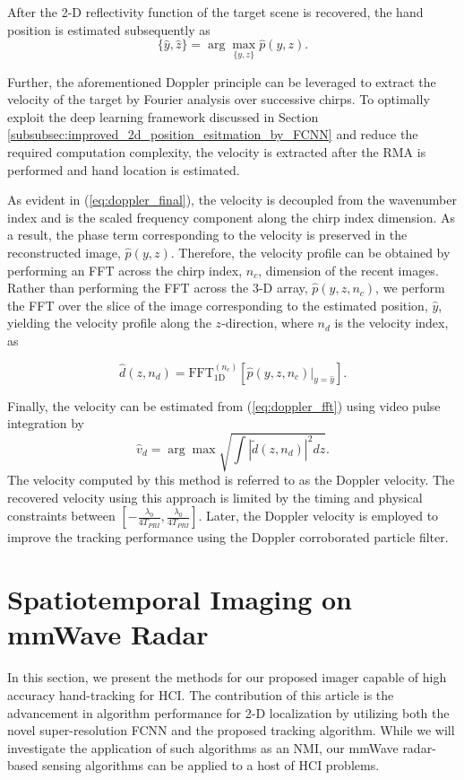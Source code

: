 \documentclass[10pt,journal,final]{IEEEtran}
\begin{document}
After the 2-D reflectivity function of the target scene is recovered, the hand position is estimated subsequently as
\begin{equation}
\label{eq:location_estimate}
    \{\hat{y},\hat{z}\} = \arg \max_{\{y,z\}} \hat{p}(y,z).
\end{equation}

Further, the aforementioned Doppler principle can be leveraged to extract the velocity of the target by Fourier analysis over successive chirps. 
To optimally exploit the deep learning framework discussed in Section \ref{subsubsec:improved_2d_position_esitmation_by_FCNN} and reduce the required computation complexity, the velocity is extracted after the RMA is performed and hand location is estimated.

As evident in (\ref{eq:doppler_final}), the velocity is decoupled from the wavenumber index and is the scaled frequency component along the chirp index dimension. 
As a result, the phase term corresponding to the velocity is preserved in the reconstructed image, $\hat{p}(y,z)$. 
Therefore, the velocity profile can be obtained by performing an FFT across the chirp index, $n_c$, dimension of the recent images.
Rather than performing the FFT across the 3-D array, $\hat{p}(y,z,n_c)$, we perform the FFT over the slice of the image corresponding to the estimated position, $\hat{y}$, yielding the velocity profile along the $z$-direction, where $n_d$ is the velocity index, as

\begin{equation}
	\label{eq:doppler_fft}
	\hat{d}(z,n_d) = \text{FFT}_{\text{1D}}^{(n_c)} \left[ \hat{p}(y,z,n_c) \biggr\rvert_{y = \hat{y}} \right].
\end{equation}

Finally, the velocity can be estimated from (\ref{eq:doppler_fft}) using video pulse integration by 
\begin{equation}
	\label{eq:velocity_doppler}
	\hat{v}_d = \arg \max \sqrt{\int |\tilde{d}(z,n_d)|^2 dz}.
\end{equation}
The velocity computed by this method is referred to as the Doppler velocity.
The recovered velocity using this approach is limited by the timing and physical constraints between $[-\frac{\lambda_0}{4T_{PRI}},\frac{\lambda_0}{4T_{PRI}}]$.
Later, the Doppler velocity is employed to improve the tracking performance using the Doppler corroborated particle filter.

\section{Spatiotemporal Imaging on mmWave Radar}
\label{sec:the_radar_musical_instrument}
In this section, we present the methods for our proposed imager capable of high accuracy hand-tracking for HCI. 
The contribution of this article is the advancement in algorithm performance for 2-D localization by utilizing both the novel super-resolution FCNN and the proposed tracking algorithm. 
While we will investigate the application of such algorithms as an NMI, our mmWave radar-based sensing algorithms can be applied to a host of HCI problems.
\end{document}
